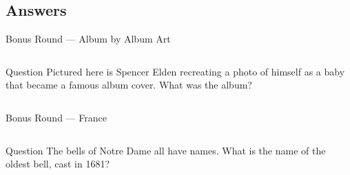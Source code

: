 \documentclass[11pt]{beamer}
\begin{document}
\subsection{Answers}
\begin{frame}[t]{Bonus Round --- Album by Album Art}
\begin{columns}[T,totalwidth=\linewidth]
\begin{column}{0.32\linewidth}
\begin{block}{Question}
Pictured here is Spencer Elden recreating a photo of himself as a baby that became a famous album cover. What was the album?
\end{block}
\end{column}
\begin{column}{0.65\linewidth}
\begin{center}
\texttt{[image: \{Images/nevermind]}.jpg}
\end{center}
\end{column}
\end{columns}
\end{frame}
\begin{frame}[t]{Bonus Round --- France}
\begin{columns}[T,totalwidth=\linewidth]
\begin{column}{0.32\linewidth}
\begin{block}{Question}
The bells of Notre Dame all have names.  What is the name of the oldest bell, cast in 1681?
\end{block}
\end{column}
\begin{column}{0.65\linewidth}
\begin{center}
\texttt{[image: \{Images/emannuelbell]}.jpg}
\end{center}
\end{column}
\end{columns}
\end{frame}
\end{document}
